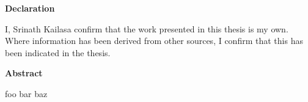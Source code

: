 \thispagestyle{plain}

\begin{center}
    \textbf{Declaration}
\end{center}
I, Srinath Kailasa confirm that the work presented in this thesis is my own. Where information has been derived from other 
sources, I confirm that this has been indicated in the thesis.

\begin{center}
    \textbf{Abstract}
\end{center}
foo bar baz